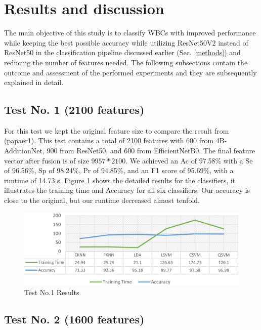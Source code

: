 \documentclass[conference]{IEEEtran}
\begin{document}
\section{Results and discussion}

The main objective of this study is to classify WBCs with improved performance while keeping the best possible accuracy while utilizing ResNet50V2 instead of ResNet50 in the classification pipeline discussed earlier (Sec. \ref{methods}) and reducing the number of features needed.
The following subsections contain the outcome and assessment of the performed experiments and they are subsequently explained in detail.

\subsection{Test No. 1 (2100 features)}
For this test we kept the original feature size to compare the result from (papaer1).
This test contains a total of 2100 features with 600 from 4B-AdditionNet, 900 from ResNet50, and 600 from EfficientNetB0. 
The final feature vector after fusion is of size $9957*2100$.
We achieved an Ac of 97.58\% with a Se of 96.56\%, Sp of 98.24\%, Pr of 94.85\%, and an F1 score of 95.69\%, with a runtime of 14.73 s. 
Figure \ref{test1} shows the detailed results for the classifiers, it illustrates the training time and Accuracy for all six classifiers.
Our accuracy is close to the original, but our runtime decreased almost tenfold.

\begin{figure}[htbp]
    \begin{center}
    \includegraphics[scale=0.25]{test1.png}
    \end{center}
    \caption{Test No.1 Results}
    \label{test1}
\end{figure}

\subsection{Test No. 2 (1600 features)}
\end{document}
